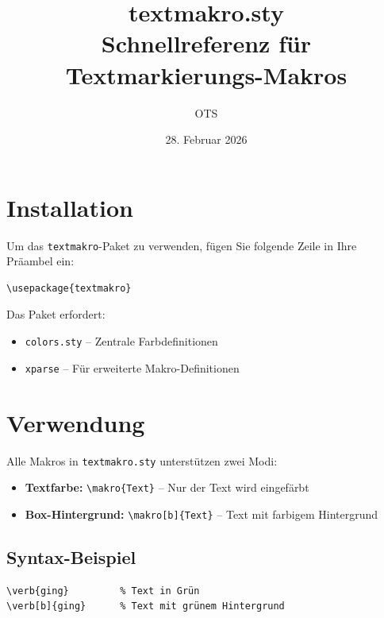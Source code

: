 \documentclass[12pt,a4paper]{scrartcl}
\title{\textbf{textmakro.sty}\\[0.5em]\Large Schnellreferenz für Textmarkierungs-Makros}
\author{OTS}
\date{28. Februar 2026}
\begin{document}
\maketitle
\tableofcontents
\newpage

\section{Installation}

Um das \texttt{textmakro}-Paket zu verwenden, fügen Sie folgende Zeile in Ihre Präambel ein:

\begin{lstlisting}
\usepackage{textmakro}
\end{lstlisting}

Das Paket erfordert:
\begin{itemize}
  \item \texttt{colors.sty} -- Zentrale Farbdefinitionen
  \item \texttt{xparse} -- Für erweiterte Makro-Definitionen
\end{itemize}

\section{Verwendung}

Alle Makros in \texttt{textmakro.sty} unterstützen zwei Modi:

\begin{itemize}
  \item \textbf{Textfarbe:} \lstinline|\makro{Text}| -- Nur der Text wird eingefärbt
  \item \textbf{Box-Hintergrund:} \lstinline|\makro[b]{Text}| -- Text mit farbigem Hintergrund
\end{itemize}

\subsection{Syntax-Beispiel}

\begin{lstlisting}
\verb{ging}         % Text in Grün
\verb[b]{ging}      % Text mit grünem Hintergrund
\end{lstlisting}

\end{document}

